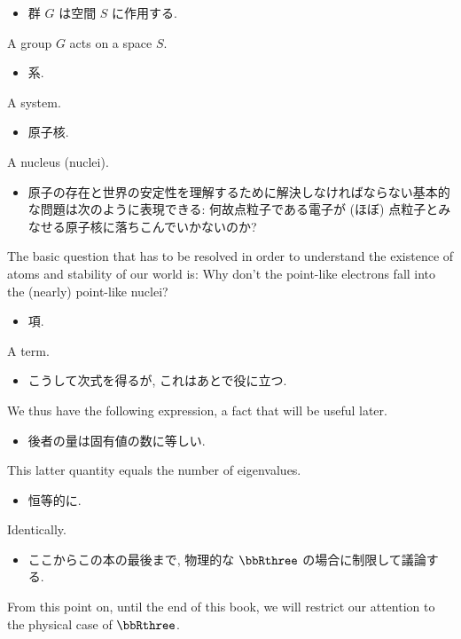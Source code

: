 \documentclass[openany, a4paper, oneside]{jsbook}
\begin{document}
\begin{itemize}
\item 群 $G$ は空間 $S$ に作用する.
\end{itemize}
A group $G$ acts on a space $S$.

\begin{itemize}
\item 系.
\end{itemize}
A system.

\begin{itemize}
\item 原子核.
\end{itemize}
A nucleus (nuclei).

\begin{itemize}
\item 原子の存在と世界の安定性を理解するために解決しなければならない基本的な問題は次のように表現できる:
何故点粒子である電子が (ほぼ) 点粒子とみなせる原子核に落ちこんでいかないのか? \cite{LiebSeiringer1}
\end{itemize}
The basic question that has to be resolved in order to understand the existence of atoms and stability of our world is:
Why don't the point-like electrons fall into the (nearly) point-like nuclei?

\begin{itemize}
\item 項.
\end{itemize}
A term.

\begin{itemize}
\item こうして次式を得るが, これはあとで役に立つ. \cite{LiebSeiringer1}
\end{itemize}
We thus have the following expression, a fact that will be useful later.

\begin{itemize}
\item 後者の量は固有値の数に等しい. \cite{LiebSeiringer1}
\end{itemize}
This latter quantity equals the number of eigenvalues.

\begin{itemize}
\item 恒等的に.
\end{itemize}
Identically.

\begin{itemize}
\item ここからこの本の最後まで, 物理的な $\bbRthree$ の場合に制限して議論する. \cite{LiebSeiringer1}
\end{itemize}
From this point on, until the end of this book, we will restrict our attention to
the physical case of $\bbRthree$.
\end{document}
